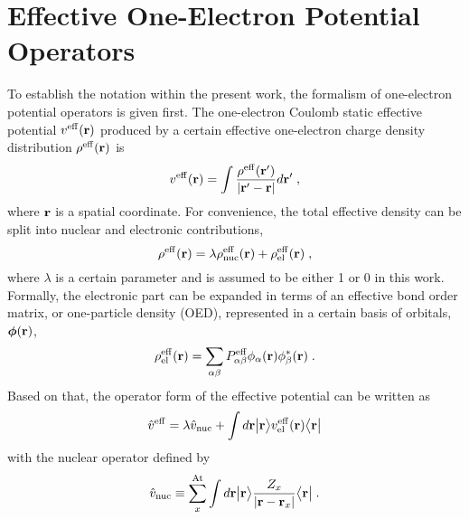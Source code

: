 \section{\label{s:2.oep}Effective One-Electron Potential Operators}

To establish the notation within the present work, 
the formalism of one\hyp{}electron potential operators is
given first.
The one\hyp{}electron Coulomb static effective potential $v^{\rm eff}({\bf r})$
produced by a certain effective one\hyp{}electron charge density distribution $\rho^{\rm eff}({\bf r})$
is 
%
\begin{equation} \label{e:v-eff}
	v^{\rm eff}({\bf r}) = \int \frac{ \rho^{\rm eff}({\bf r}') }{ \vert {\bf r}' - {\bf r} \vert} d{\bf r}' \;,
\end{equation}
%
where ${\bf r}$ is a spatial coordinate. 
For convenience, the total effective density can be split into nuclear and electronic contributions,
%
\begin{equation} \label{e:rho-eff}
 \rho^{\rm eff}({\bf r}) = \lambda \rho^{\rm eff}_{\rm nuc}({\bf r}) + \rho^{\rm eff}_{\rm el}({\bf r}) \;,
\end{equation}
%
where $\lambda$ is a certain parameter and is assumed to be either 1 or 0 in this work.
Formally, the electronic part can be expanded in terms of an effective
bond order matrix, or one\hyp{}particle density (OED), represented in a certain basis of orbitals, $\BM{\phi}({\bf r})$,
%
\begin{equation} \label{e:d-spectral}
	\rho^{\rm eff}_{\rm el}({\bf r}) = \sum_{\alpha\beta} P_{\alpha\beta}^{\rm eff} 
	\phi_\alpha({\bf r}) \phi_\beta^{*}({\bf r})  \;.
\end{equation}
%
Based on that, the operator form of the effective potential 
can be written as
%
\begin{equation} \label{e:oep-operator}
	\hat{v}^{\rm eff} = 
        \lambda \hat{v}_{\rm nuc} +
        \int d{\bf r} \Ket{{\bf r}} 
        v^{\rm eff}_{\rm el}({\bf r})
        \Bra{{\bf r}}
\end{equation}
%
with the nuclear
operator
defined by
%
\begin{equation} \label{e:oep-operator-nuc}
        \hat{v}_{\rm nuc} \equiv \sum_x^{\rm At}  
                     \int d{\bf r} \Ket{{\bf r}} 
                     \frac{Z_x}{\vert {\bf r} - {\bf r}_x \vert}
                     \Bra{{\bf r}} \;.
\end{equation}
